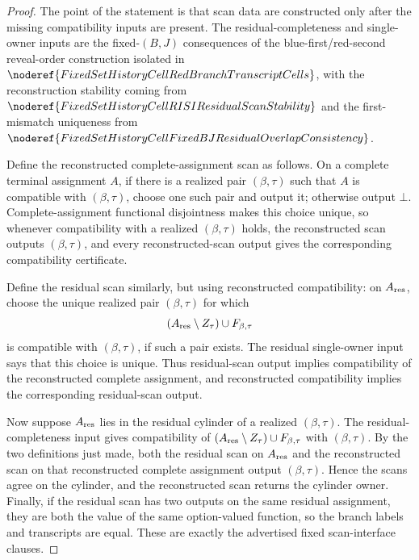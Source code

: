 \begin{proof}
The point of the statement is that scan data are constructed only after the
missing compatibility inputs are present.  The residual-completeness and
single-owner inputs are the fixed-\((B,J)\) consequences of the
blue-first/red-second reveal-order construction isolated in
\(\noderef{FixedSetHistoryCellRedBranchTranscriptCells}\), with the
reconstruction stability coming from
\(\noderef{FixedSetHistoryCellRISIResidualScanStability}\) and the
first-mismatch uniqueness from
\(\noderef{FixedSetHistoryCellFixedBJResidualOverlapConsistency}\).

Define the reconstructed complete-assignment scan as follows.  On a complete
terminal assignment \(A\), if there is a realized pair
\((\beta,\tau)\) such that \(A\) is compatible with \((\beta,\tau)\), choose
one such pair and output it; otherwise output \(\bot\).  Complete-assignment
functional disjointness makes this choice unique, so whenever compatibility
with a realized \((\beta,\tau)\) holds, the reconstructed scan outputs
\((\beta,\tau)\), and every reconstructed-scan output gives the corresponding
compatibility certificate.

Define the residual scan similarly, but using reconstructed compatibility:
on \(A_{\rm res}\), choose the unique realized pair \((\beta,\tau)\) for
which
\[
(A_{\rm res}\setminus Z_\tau)\cup F_{\beta,\tau}
\]
is compatible with \((\beta,\tau)\), if such a pair exists.  The residual
single-owner input says that this choice is unique.  Thus residual-scan
output implies compatibility of the reconstructed complete assignment, and
reconstructed compatibility implies the corresponding residual-scan output.

Now suppose \(A_{\rm res}\) lies in the residual cylinder of a realized
\((\beta,\tau)\).  The residual-completeness input gives compatibility of
\((A_{\rm res}\setminus Z_\tau)\cup F_{\beta,\tau}\) with
\((\beta,\tau)\).  By the two definitions just made, both the residual scan
on \(A_{\rm res}\) and the reconstructed scan on that reconstructed complete
assignment output \((\beta,\tau)\).  Hence the scans agree on the cylinder,
and the reconstructed scan returns the cylinder owner.  Finally, if the
residual scan has two outputs on the same residual assignment, they are both
the value of the same option-valued function, so the branch labels and
transcripts are equal.  These are exactly the advertised fixed scan-interface
clauses.
\end{proof}
